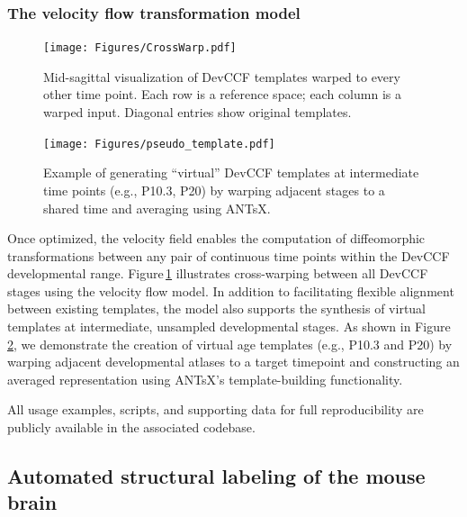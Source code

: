 \documentclass[
  12pt,
]{article}
\begin{document}
\subsubsection{The velocity flow transformation
model}\label{the-velocity-flow-transformation-model}

\begin{figure}[!htb]
\centering
\texttt{[image: Figures/CrossWarp.pdf]}
\caption{Mid-sagittal visualization of DevCCF templates warped to every other time point. Each row is a reference space; each column is a warped input. Diagonal entries show original templates.}
\label{fig:crosswarp}
\end{figure}

\begin{figure}[!htb]
\centering
\texttt{[image: Figures/pseudo\_template.pdf]}
\caption{Example of generating “virtual” DevCCF templates at intermediate time points (e.g., P10.3, P20) by warping adjacent stages to a shared time and averaging using ANTsX.}
\label{fig:virtual}
\end{figure}

Once optimized, the velocity field enables the computation of
diffeomorphic transformations between any pair of continuous time points
within the DevCCF developmental range. Figure\,\ref{fig:crosswarp}
illustrates cross-warping between all DevCCF stages using the velocity
flow model. In addition to facilitating flexible alignment between
existing templates, the model also supports the synthesis of virtual
templates at intermediate, unsampled developmental stages. As shown in
Figure\,\ref{fig:virtual}, we demonstrate the creation of virtual age
templates (e.g., P10.3 and P20) by warping adjacent developmental
atlases to a target timepoint and constructing an averaged
representation using ANTsX's template-building functionality.

All usage examples, scripts, and supporting data for full
reproducibility are publicly available in the associated codebase.

\subsection{Automated structural labeling of the mouse
brain}\label{automated-structural-labeling-of-the-mouse-brain}
\end{document}

